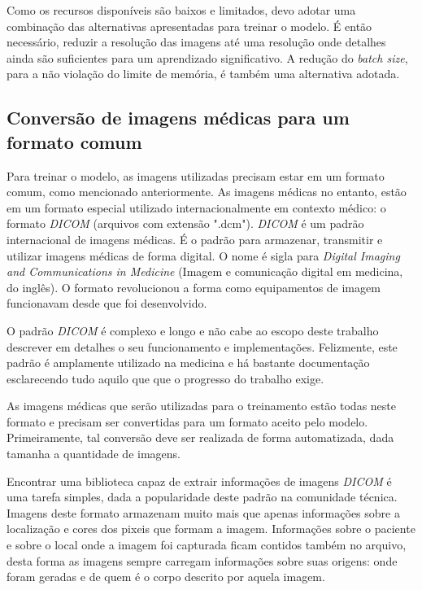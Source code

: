 Como os recursos disponíveis são baixos e limitados, devo adotar uma combinação das alternativas apresentadas para treinar o modelo. É então necessário, reduzir a resolução das imagens até uma resolução onde detalhes ainda são suficientes para um aprendizado significativo. A redução do \textit{batch size}, para a não violação do limite de memória, é também uma alternativa adotada.

\subsection{Conversão de imagens médicas para um formato comum}

Para treinar o modelo, as imagens utilizadas precisam estar em um formato comum, como mencionado anteriormente. As imagens médicas no entanto, estão em um formato especial utilizado internacionalmente em contexto médico: o formato \textit{DICOM} (arquivos com extensão ".dcm"). \textit{DICOM} é um padrão internacional de imagens médicas. É o padrão para armazenar, transmitir e utilizar imagens médicas de forma digital. O nome é sigla para \textit{Digital Imaging and Communications in Medicine} (Imagem e comunicação digital em medicina, do inglês). O formato revolucionou a forma como equipamentos de imagem funcionavam desde que foi desenvolvido. \cite{dicom_standard_history_2019, medical_connections_dicomobjects_2011, dicom_standard_current_2024, medical_connections_dicom_2007, weston_understanding_2020}
    
O padrão \textit{DICOM} é complexo e longo e não cabe ao escopo deste trabalho descrever em detalhes o seu funcionamento e implementações. Felizmente, este padrão é amplamente utilizado na medicina e há bastante documentação esclarecendo tudo aquilo que que o progresso do trabalho exige.

As imagens médicas que serão utilizadas para o treinamento estão todas neste formato e precisam ser convertidas para um formato aceito pelo modelo. Primeiramente, tal conversão deve ser realizada de forma automatizada, dada tamanha a quantidade de imagens.

Encontrar uma biblioteca capaz de extrair informações de imagens \textit{DICOM} é uma tarefa simples, dada a popularidade deste padrão na comunidade técnica. Imagens deste formato armazenam muito mais que apenas informações sobre a localização e cores dos pixeis que formam a imagem. Informações sobre o paciente e sobre o local onde a imagem foi capturada ficam contidos também no arquivo, desta forma as imagens sempre carregam informações sobre suas origens: onde foram geradas e de quem é o corpo descrito por aquela imagem.

